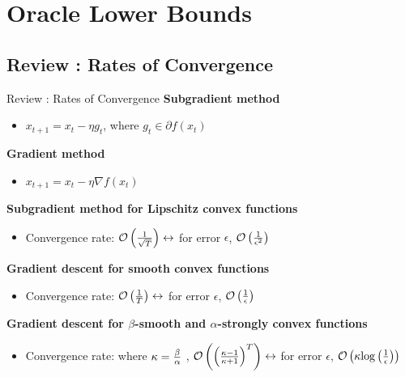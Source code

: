 \section{Oracle Lower Bounds}
\subsection{Review : Rates of Convergence}
\begin{frame}{Review : Rates of Convergence}
    \textbf{Subgradient method}
    \begin{itemize}
        \item  $x_{t+1} = x_t- \eta g_t$, where $g_t \in \partial f(x_t)$
    \end{itemize}
    
    \textbf{Gradient method}
    \begin{itemize}
        \item  $x_{t+1} = x_t- {\eta}{\nabla}f(x_t)$
    \end{itemize}
    
    \textbf{Subgradient method for Lipschitz convex functions}
    \begin{itemize}
        \item  Convergence rate: $ \mathcal{O}\left({1 \over {\sqrt{T}}}\right)  \leftrightarrow $ for error $ \epsilon$, $\mathcal{O}\left({1 \over \epsilon^2}\right)$
    \end{itemize}
    
    \textbf{Gradient descent for smooth convex functions}
    \begin{itemize}
        \item  Convergence rate: $ \mathcal{O}\left({1 \over T}\right)  \leftrightarrow $ for error $ \epsilon$, $ \mathcal{O}\left({1 \over \epsilon}\right)$
    \end{itemize}

    \textbf{Gradient descent for $\beta$-smooth and $\alpha$-strongly convex functions}
    \begin{itemize}
        \item  Convergence rate: where $ \kappa = {\beta \over \alpha}$ , $ \mathcal{O}\left(\left({\kappa-1 \over \kappa+1}\right)^T\right)  \leftrightarrow $ for error $ \epsilon$, $ \mathcal{O}\left(\kappa{\log\left({1 \over \epsilon}\right)}\right)$
    \end{itemize}
    
\end{frame}



